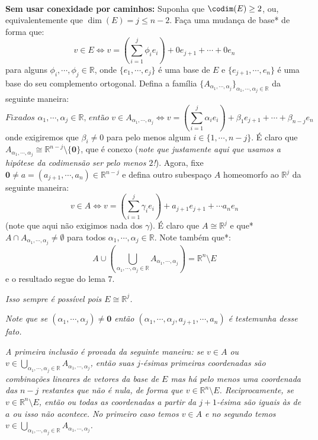 \begin{dem} \\
\textbf{Sem usar conexidade por caminhos:} Suponha que $\codim(E) \geq 2$, ou, equivalentemente que $\dim(E) = j \leq n - 2$. Faça uma mudança de base* de forma que:
    $$v \in E \iff v = \left(\displaystyle{\sum_{i = 1}^{j} \phi_i e_i} \right) + 0e_{j+1} + \cdots + 0e_n$$
    para alguns $\phi_i, \cdots, \phi_j \in \mathbb{R}$, onde $\{e_1, \cdots, e_j  \}$ é uma base de $E$ e $\{e_{j+1}, \cdots, e_n \}$ é uma base do seu complemento ortogonal. Defina a família $\{A_{\alpha_1, \cdots, \alpha_j} \}_{\alpha_1, \cdots, \alpha_j \in \mathbb{R}}$ da seguinte maneira:
    $$\textit{Fixados $\alpha_1, \cdots, \alpha_j \in \mathbb{R}$, então } v \in A_{\alpha_1, \cdots, \alpha_j} \iff v = \left(\displaystyle{\sum_{i=1}^{j} \alpha_i e_i}\right) + \beta_1 e_{j+1} + \cdots + \beta_{n-j} e_{n}  $$
    onde exigiremos que $\beta_i \neq 0$ para pelo menos algum $i \in \{1, \cdots, n-j \}$. É claro que $A_{\alpha_1, \cdots, \alpha_j} \cong \mathbb{R}^{n-j}\setminus \{\mathbf{0} \}$, que é conexo (\textit{note que justamente aqui que usamos a hipótese da codimensão ser pelo menos $2$!}). Agora, fixe $\mathbf{0} \neq a = (a_{j+1}, \cdots, a_n) \in \mathbb{R}^{n-j}$ e defina outro subespaço $A$ homeomorfo ao $\mathbb{R}^j$ da seguinte maneira:
    $$v \in A \iff v = \left(\displaystyle{\sum_{i = 1}^{j}\gamma_i e_i} \right) + a_{j+1} e_{j+1} + \cdots a_n e_n$$
    (note que aqui não exigimos nada dos $\gamma$). É claro que $A \cong \mathbb{R}^j$ e que* $A \cap A_{\alpha_1, \cdots, \alpha_j} \neq \emptyset$ para todos $\alpha_1, \cdots, \alpha_j \in \mathbb{R}$. Note também que*:
    $$A \cup \left(\displaystyle{\bigcup_{\alpha_1, \cdots, \alpha_j \in \mathbb{R}} A_{\alpha_1, \cdots, \alpha_j}} \right) = \mathbb{R}^n \setminus E$$
    e o resultado segue do lema $7$.
    \begin{oobs}
    \textit{Isso sempre é possível pois $E \cong \mathbb{R}^j$.}
    \end{oobs}
    \begin{oobs}
    \textit{Note que se $(\alpha_1, \cdots, \alpha_j) \neq \mathbf{0}$ então $(\alpha_1, \cdots, \alpha_j, a_{j+1}, \cdots, a_n)$ é testemunha desse fato.}
    \end{oobs}
    \begin{oobs}
    \textit{A primeira inclusão é provada da seguinte maneira: se $v \in A$ ou $v \in \displaystyle{\bigcup_{\alpha_1, \cdots, \alpha_j \in \mathbb{R}} A_{\alpha_1, \cdots, \alpha_j}} $, então suas $j$-ésimas primeiras coordenadas são combinações lineares de vetores da base de $E$ mas há pelo menos uma coordenada das $n-j$ restantes que não é nula, de forma que $v \in \mathbb{R}^n \setminus E$. Reciprocamente, se $v \in \mathbb{R}^n \setminus E$, então ou todas as coordenadas a partir da $j+1$-ésima são iguais às de $a$ ou isso não acontece. No primeiro caso temos $v \in A$ e no segundo temos $v \in \displaystyle{\bigcup_{\alpha_1, \cdots, \alpha_j \in \mathbb{R}} A_{\alpha_1, \cdots, \alpha_j}}$.}

\end{oobs}
\end{dem}
